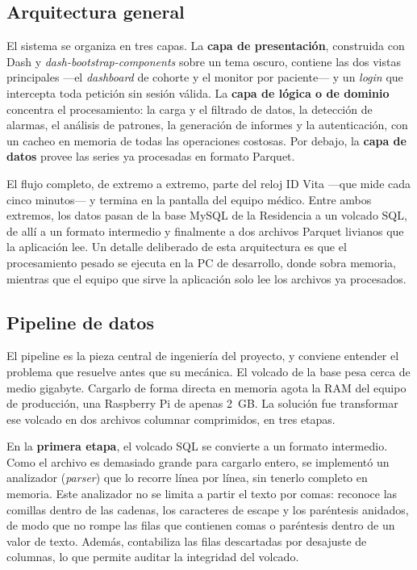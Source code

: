 \documentclass[12pt,a4paper]{article}
\begin{document}
    \subsection{Arquitectura general}
    El sistema se organiza en tres capas. La \textbf{capa de presentación}, construida con Dash y \textit{dash-bootstrap-components} sobre un tema oscuro, contiene las dos vistas principales —el \textit{dashboard} de cohorte y el monitor por paciente— y un \textit{login} que intercepta toda petición sin sesión válida. La \textbf{capa de lógica o de dominio} concentra el procesamiento: la carga y el filtrado de datos, la detección de alarmas, el análisis de patrones, la generación de informes y la autenticación, con un cacheo en memoria de todas las operaciones costosas. Por debajo, la \textbf{capa de datos} provee las series ya procesadas en formato Parquet.

    El flujo completo, de extremo a extremo, parte del reloj ID Vita —que mide cada cinco minutos— y termina en la pantalla del equipo médico. Entre ambos extremos, los datos pasan de la base MySQL de la Residencia a un volcado SQL, de allí a un formato intermedio y finalmente a dos archivos Parquet livianos que la aplicación lee. Un detalle deliberado de esta arquitectura es que el procesamiento pesado se ejecuta en la PC de desarrollo, donde sobra memoria, mientras que el equipo que sirve la aplicación solo lee los archivos ya procesados.


    \subsection{Pipeline de datos}
    El pipeline es la pieza central de ingeniería del proyecto, y conviene entender el problema que resuelve antes que su mecánica. El volcado de la base pesa cerca de medio gigabyte. Cargarlo de forma directa en memoria agota la RAM del equipo de producción, una Raspberry Pi de apenas 2~GB. La solución fue transformar ese volcado en dos archivos columnar comprimidos, en tres etapas.

    En la \textbf{primera etapa}, el volcado SQL se convierte a un formato intermedio. Como el archivo es demasiado grande para cargarlo entero, se implementó un analizador (\textit{parser}) que lo recorre línea por línea, sin tenerlo completo en memoria. Este analizador no se limita a partir el texto por comas: reconoce las comillas dentro de las cadenas, los caracteres de escape y los paréntesis anidados, de modo que no rompe las filas que contienen comas o paréntesis dentro de un valor de texto. Además, contabiliza las filas descartadas por desajuste de columnas, lo que permite auditar la integridad del volcado.
\end{document}
